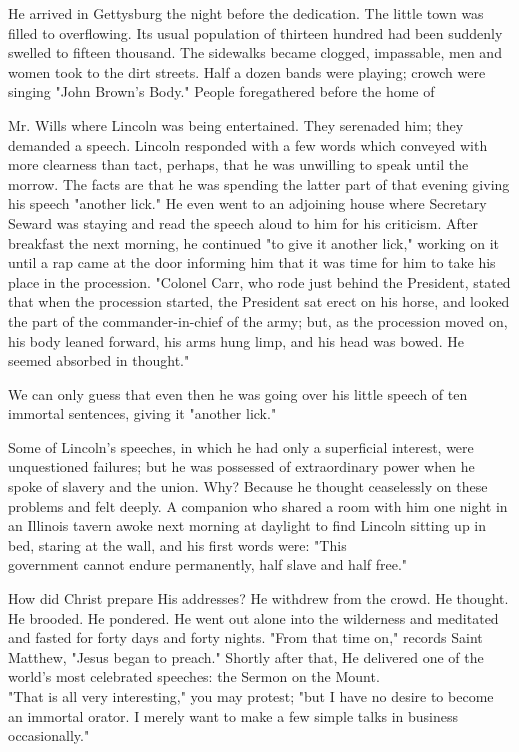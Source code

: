 \documentclass[10pt]{article}
\begin{document}
He arrived in Gettysburg the night before the dedication. The little town was filled to overflowing. Its usual population of thirteen hundred had been suddenly swelled to fifteen thousand. The sidewalks became clogged, impassable, men and women took to the dirt streets. Half a dozen bands were playing; crowch were singing "John Brown's Body." People foregathered before the home of

Mr. Wills where Lincoln was being entertained. They serenaded him; they demanded a speech. Lincoln responded with a few words which conveyed with more clearness than tact, perhaps, that he was unwilling to speak until the morrow. The facts are that he was spending the latter part of that evening giving his speech "another lick." He even went to an adjoining house where Secretary Seward was staying and read the speech aloud to him for his criticism. After breakfast the next morning, he continued "to give it another lick," working on it until a rap came at the door informing him that it was time for him to take his place in the procession. "Colonel Carr, who rode just behind the President, stated that when the procession started, the President sat erect on his horse, and looked the part of the commander-in-chief of the army; but, as the procession moved on, his body leaned forward, his arms hung limp, and his head was bowed. He seemed absorbed in thought."

We can only guess that even then he was going over his little speech of ten immortal sentences, giving it "another lick."

Some of Lincoln's speeches, in which he had only a superficial interest, were unquestioned failures; but he was possessed of extraordinary power when he spoke of slavery and the union. Why? Because he thought ceaselessly on these problems and felt deeply. A companion who shared a room with him one night in an Illinois tavern awoke next morning at daylight to find Lincoln sitting up in bed, staring at the wall, and his first words were: "This\\
government cannot endure permanently, half slave and half free."

How did Christ prepare His addresses? He withdrew from the crowd. He thought. He brooded. He pondered. He went out alone into the wilderness and meditated and fasted for forty days and forty nights. "From that time on," records Saint Matthew, "Jesus began to preach." Shortly after that, He delivered one of the world's most celebrated speeches: the Sermon on the Mount.\\
"That is all very interesting," you may protest; "but I have no desire to become an immortal orator. I merely want to make a few simple talks in business occasionally."
\end{document}
